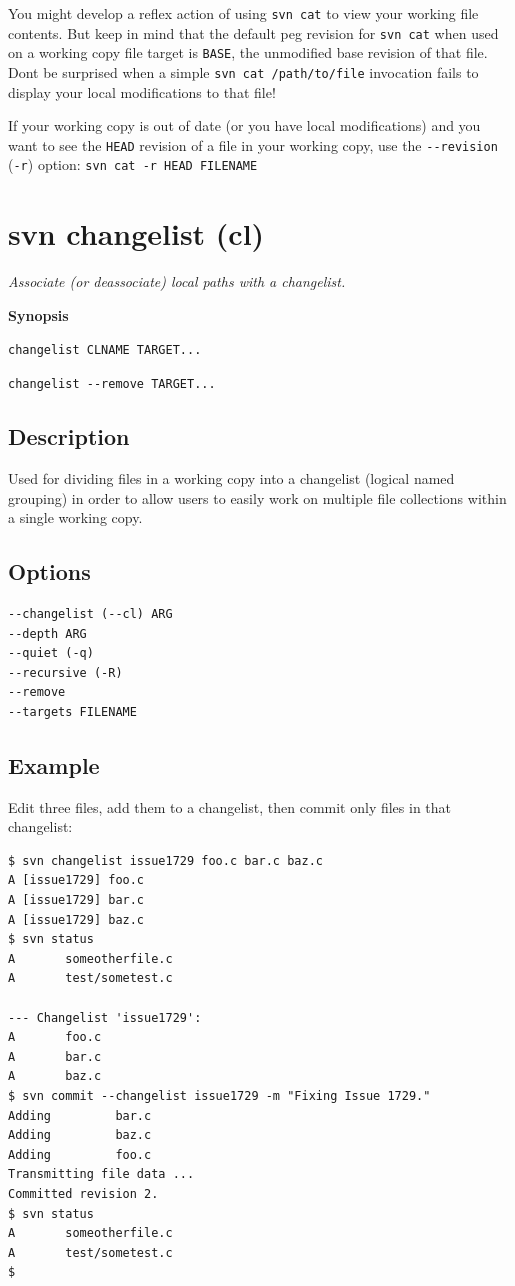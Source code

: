 You might develop a reflex action of using \texttt{svn\ cat} to view
your working file contents. But keep in mind that the default peg
revision for \texttt{svn\ cat} when used on a working copy file target
is \texttt{BASE}, the unmodified base revision of that file.
Don\textquotesingle t be surprised when a simple
\texttt{svn\ cat\ /path/to/file} invocation fails to display your local
modifications to that file!

If your working copy is out of date (or you have local modifications)
and you want to see the \texttt{HEAD} revision of a file in your working
copy, use the \texttt{-\/-revision} (\texttt{-r}) option:
\texttt{svn\ cat\ -r\ HEAD\ FILENAME}

\section{svn changelist (cl)}\label{svn.ref.svn.c.changelist}

\emph{Associate (or deassociate) local paths with a changelist.}

\textbf{Synopsis}

\texttt{changelist\ CLNAME\ TARGET...}

\texttt{changelist\ -\/-remove\ TARGET...}

\subsection{Description}

Used for dividing files in a working copy into a changelist (logical
named grouping) in order to allow users to easily work on multiple file
collections within a single working copy.

\subsection{Options}

\begin{verbatim}
--changelist (--cl) ARG
--depth ARG
--quiet (-q)
--recursive (-R)
--remove
--targets FILENAME
\end{verbatim}

\subsection{Example}

Edit three files, add them to a changelist, then commit only files in
that changelist:

\begin{verbatim}
$ svn changelist issue1729 foo.c bar.c baz.c
A [issue1729] foo.c
A [issue1729] bar.c
A [issue1729] baz.c
$ svn status
A       someotherfile.c
A       test/sometest.c

--- Changelist 'issue1729':
A       foo.c
A       bar.c
A       baz.c
$ svn commit --changelist issue1729 -m "Fixing Issue 1729."
Adding         bar.c
Adding         baz.c
Adding         foo.c
Transmitting file data ...
Committed revision 2.
$ svn status
A       someotherfile.c
A       test/sometest.c
$
\end{verbatim}

